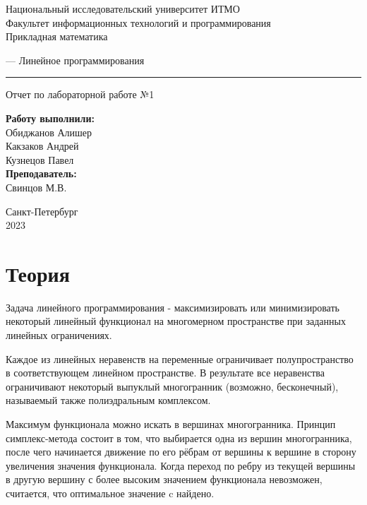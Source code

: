 \documentclass{article}
\begin{document}
\begin{center}
    Национальный исследовательский университет ИТМО\\
    Факультет информационных технологий и программирования\\
    Прикладная математика
\end{center}
\vspace{20em}
\begin{center}
    {\Large — Линейное программирования}
    \vspace{3pt}
    \hrule
    \vspace{3pt}
    Отчет по лабораторной работе №1
\end{center}
\vspace{20em}
\begin{flushright}
    \textbf{ Работу выполнили: } \\
    Обиджанов Алишер\\
    Какзаков Андрей\\
    Кузнецов Павел\\
    \vspace{1em}
    \textbf{ Преподаватель: } \\
    Свинцов М.В.
\end{flushright}
\vspace{12em}
\begin{center}
    Санкт-Петербург \\
    2023
\end{center}
\newpage

\section{Теория}
Задача линейного программирования - максимизировать или минимизировать некоторый линейный функционал на многомерном пространстве при заданных линейных ограничениях.

Каждое из линейных неравенств на переменные ограничивает полупространство в соответствующем линейном пространстве. В результате все неравенства ограничивают некоторый выпуклый многогранник (возможно, бесконечный), называемый также полиэдральным комплексом.

Максимум функционала можно искать в вершинах многогранника. Принцип симплекс-метода состоит в том, что выбирается одна из вершин многогранника, после чего начинается движение по его рёбрам от вершины к вершине в сторону увеличения значения функционала. Когда переход по ребру из текущей вершины в другую вершину с более высоким значением функционала невозможен, считается, что оптимальное значение c найдено.
\end{document}
